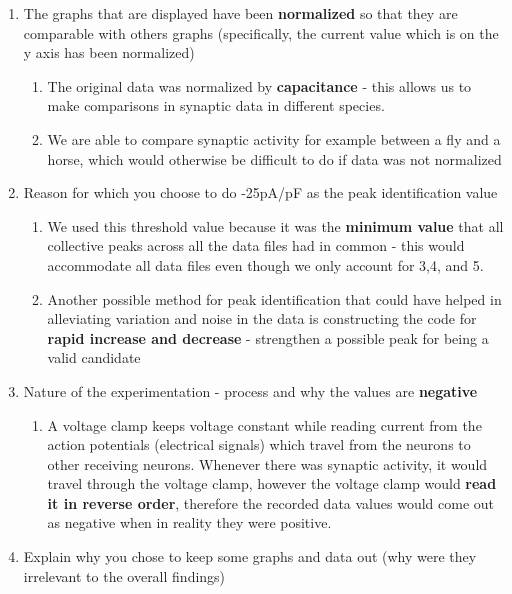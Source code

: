 \begin{enumerate}
\def\labelenumi{\arabic{enumi}.}
\item
  The graphs that are displayed have been \textbf{normalized} so that
  they are comparable with others graphs (specifically, the current
  value which is on the y axis has been normalized)

  \begin{enumerate}
  \def\labelenumii{\alph{enumii}.}
  \item
    The original data was normalized by \textbf{capacitance} - this
    allows us to make comparisons in synaptic data in different species.
  \item
    We are able to compare synaptic activity for example between a fly
    and a horse, which would otherwise be difficult to do if data was
    not normalized
  \end{enumerate}
\item
  Reason for which you choose to do -25pA/pF as the peak identification
  value

  \begin{enumerate}
  \def\labelenumii{\alph{enumii}.}
  \item
    We used this threshold value because it was the \textbf{minimum
    value} that all collective peaks across all the data files had in
    common - this would accommodate all data files even though we only
    account for 3,4, and 5.
  \item
    Another possible method for peak identification that could have
    helped in alleviating variation and noise in the data is
    constructing the code for \textbf{rapid increase and decrease} -
    strengthen a possible peak for being a valid candidate
  \end{enumerate}
\item
  Nature of the experimentation - process and why the values are
  \textbf{negative}

  \begin{enumerate}
  \def\labelenumii{\alph{enumii}.}
  \item
    A voltage clamp keeps voltage constant while reading current from
    the action potentials (electrical signals) which travel from the
    neurons to other receiving neurons. Whenever there was synaptic
    activity, it would travel through the voltage clamp, however the
    voltage clamp would \textbf{read it in reverse order}, therefore the
    recorded data values would come out as negative when in reality they
    were positive.
  \end{enumerate}
\item
  Explain why you chose to keep some graphs and data out (why were they
  irrelevant to the overall findings)


\end{enumerate}

